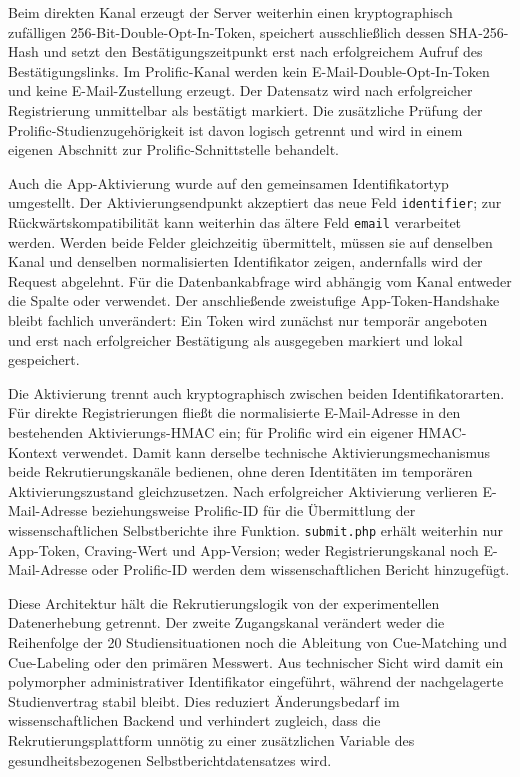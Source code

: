 \begin{neu}
Beim direkten Kanal erzeugt der Server weiterhin einen kryptographisch zufälligen 256-Bit-Double-Opt-In-Token, speichert ausschließlich dessen SHA-256-Hash und setzt den Bestätigungszeitpunkt erst nach erfolgreichem Aufruf des Bestätigungslinks. Im Prolific-Kanal werden kein E-Mail-Double-Opt-In-Token und keine E-Mail-Zustellung erzeugt. Der Datensatz wird nach erfolgreicher Registrierung unmittelbar als bestätigt markiert. Die zusätzliche Prüfung der Prolific-Studienzugehörigkeit ist davon logisch getrennt und wird in einem eigenen Abschnitt zur Prolific-Schnittstelle behandelt.

Auch die App-Aktivierung wurde auf den gemeinsamen Identifikatortyp umgestellt. Der Aktivierungsendpunkt akzeptiert das neue Feld \texttt{identifier}; zur Rückwärtskompatibilität kann weiterhin das ältere Feld \texttt{email} verarbeitet werden. Werden beide Felder gleichzeitig übermittelt, müssen sie auf denselben Kanal und denselben normalisierten Identifikator zeigen, andernfalls wird der Request abgelehnt. Für die Datenbankabfrage wird abhängig vom Kanal entweder die Spalte  oder  verwendet. Der anschließende zweistufige App-Token-Handshake bleibt fachlich unverändert: Ein Token wird zunächst nur temporär angeboten und erst nach erfolgreicher Bestätigung als ausgegeben markiert und lokal gespeichert.

Die Aktivierung trennt auch kryptographisch zwischen beiden Identifikatorarten. Für direkte Registrierungen fließt die normalisierte E-Mail-Adresse in den bestehenden Aktivierungs-HMAC ein; für Prolific wird ein eigener HMAC-Kontext verwendet. Damit kann derselbe technische Aktivierungsmechanismus beide Rekrutierungskanäle bedienen, ohne deren Identitäten im temporären Aktivierungszustand gleichzusetzen. Nach erfolgreicher Aktivierung verlieren E-Mail-Adresse beziehungsweise Prolific-ID für die Übermittlung der wissenschaftlichen Selbstberichte ihre Funktion. \texttt{submit.php} erhält weiterhin nur App-Token, Craving-Wert und App-Version; weder Registrierungskanal noch E-Mail-Adresse oder Prolific-ID werden dem wissenschaftlichen Bericht hinzugefügt.

Diese Architektur hält die Rekrutierungslogik von der experimentellen Datenerhebung getrennt. Der zweite Zugangskanal verändert weder die Reihenfolge der 20 Studiensituationen noch die Ableitung von Cue-Matching und Cue-Labeling oder den primären Messwert. Aus technischer Sicht wird damit ein polymorpher administrativer Identifikator eingeführt, während der nachgelagerte Studienvertrag stabil bleibt. Dies reduziert Änderungsbedarf im wissenschaftlichen Backend und verhindert zugleich, dass die Rekrutierungsplattform unnötig zu einer zusätzlichen Variable des gesundheitsbezogenen Selbstberichtdatensatzes wird.
\end{neu}
